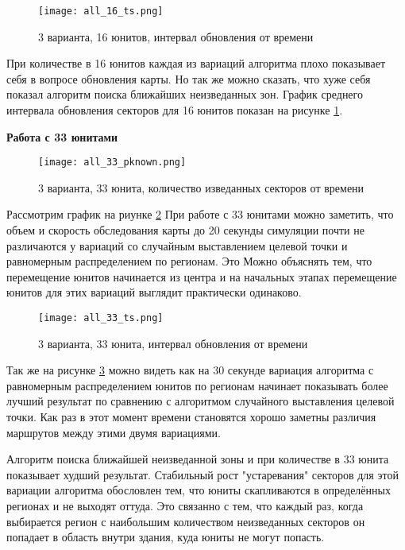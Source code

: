 \begin{figure}[h!]
    \centering
    \texttt{[image: all\_16\_ts.png]}
    \caption{3 варианта, 16 юнитов, интервал обновления от времени}
    \label{fig:all_16_ts}
\end{figure}

\newpage
При количестве в 16 юнитов каждая из вариаций алгоритма плохо показывает себя
в вопросе обновления карты. Но так же можно сказать, что хуже себя показал
алгоритм поиска ближайших неизведанных зон. График среднего интервала обновления
секторов для 16 юнитов показан на рисунке \ref{fig:all_16_ts}.

\clearpage
\newpage

\textbf{Работа с 33 юнитами}

\begin{figure}[h!]
    \centering
    \texttt{[image: all\_33\_pknown.png]}
    \caption{3 варианта, 33 юнита, количество изведанных секторов от времени}
    \label{fig:all_33_pk}
\end{figure}

Рассмотрим график на риунке \ref{fig:all_33_pk}
При работе с 33 юнитами можно заметить, что объем и скорость обследования
карты до 20 секунды симуляции почти не различаются у вариаций со случайным
выставлением целевой точки и равномерным распределением по регионам. Это
Можно объяснять тем, что перемещение юнитов начинается из центра и на
начальных этапах перемещение юнитов для этих вариаций выглядит практически
одинаково.

\begin{figure}[h!]
    \centering
    \texttt{[image: all\_33\_ts.png]}
    \caption{3 варианта, 33 юнита, интервал обновления от времени}
    \label{fig:all_33_ts}
\end{figure}

\newpage
Так же на рисунке \ref{fig:all_33_ts} можно видеть как на 30 секунде вариация
алгоритма с равномерным распределением юнитов по регионам начинает показывать
более лучший результат по сравнению с алгоритмом случайного выставления целевой
точки. Как раз в этот момент времени становятся хорошо заметны различия маршрутов
между этими двумя вариациями. 

Алгоритм поиска ближайшей неизведанной зоны и при количестве в 33 юнита показывает
худший результат. Стабильный рост "устаревания" секторов для этой вариации
алгоритма обословлен тем, что юниты скапливаются в определённых регионах и не
выходят оттуда. Это связанно с тем, что каждый раз, когда выбирается регион
с наибольшим количеством неизведанных секторов он попадает в область внутри
здания, куда юниты не могут попасть.

